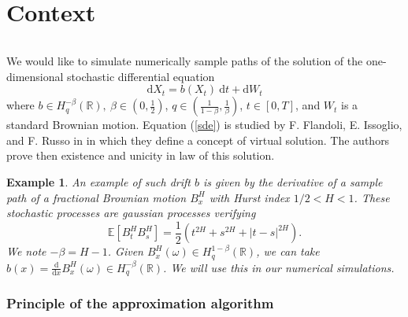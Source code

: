 \documentclass[11pt]{enstaPRE}
\newtheorem{ex}{Example}
\newcommand{\de}[2]{\frac{\mathrm{d} #1}{\mathrm{d} #2}}
\newcommand{\R}{\mathbb{R}}
\newcommand{\E}{\mathbb{E}}
\newcommand{\di}{\mathrm{d}}
\begin{document}
\couverture



%

\tableofcontents


\part{Context}
    \paragraph{}
    We would like to simulate numerically sample paths of the solution of the one-dimensional stochastic differential equation
    \begin{equation} \label{sde}
    \di X_t = b(X_t)\ \di t + \di W_t
    \end{equation}
    where $b\in H^{-\beta}_q(\R),\ \beta\in\left(0,\frac{1}{2}\right)$, $q\in\left(\frac{1}{1-\beta},\frac{1}{\beta}\right)$, $t\in[0,T]$, and $W_t$ is a standard Brownian motion. Equation (\ref{sde}) is studied by F. Flandoli, E. Issoglio, and F. Russo in \cite{Fla-Iss-Rus-2017} in which they define a concept of virtual solution. The authors prove then existence and unicity in law of this solution. 
    
    \begin{ex}
        An example of such drift $b$ is given by the derivative of a sample path of a fractional Brownian motion $B^H_x$ with Hurst index $1/2<H<1$. These stochastic processes are gaussian processes verifying $$\E\left[B_t^HB_s^H\right]=\frac{1}{2}\left(t^{2H}+s^{2H}+|t-s|^{2H}\right).$$ We note $-\beta = H - 1$. Given $B^H_x(\omega)\in H^{1-\beta}_q(\R)$, we can take $b(x) = \de{}{x}B^H_x(\omega)\in H^{-\beta}_q(\R)$. We will use this in our numerical simulations.
    \end{ex}    

\section{Principle of the approximation algorithm}
    
\end{document}
